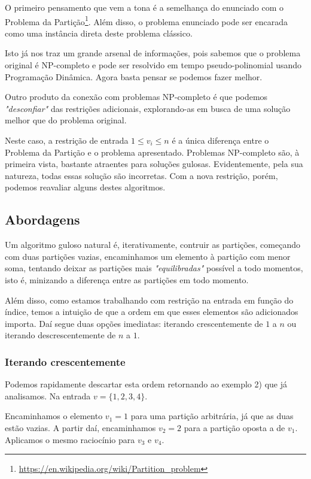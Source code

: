 O primeiro pensamento que vem a tona é a semelhança do enunciado com o Problema da Partição\footnote{\url{https://en.wikipedia.org/wiki/Partition_problem}}. Além disso, o problema enunciado pode ser encarada como uma instância direta deste problema clássico.

Isto já nos traz um grande arsenal de informações, pois sabemos que o problema original é NP-completo e pode ser resolvido em tempo pseudo-polinomial usando Programação Dinâmica. Agora basta pensar se podemos fazer melhor.

Outro produto da conexão com problemas NP-completo é que podemos \textit{"desconfiar"} das restrições adicionais, explorando-as em busca de uma solução melhor que do problema original.

Neste caso, a restrição de entrada $1 \leq v_i \leq n$ é a única diferença entre o Problema da Partição e o problema apresentado. 
Problemas NP-completo são, à primeira vista, bastante atraentes para soluções gulosas. Evidentemente, pela sua natureza, todas essas solução são incorretas. Com a nova restrição, porém, podemos reavaliar alguns destes algoritmos.

\subsection*{Abordagens}

Um algoritmo guloso natural é, iterativamente, contruir as partições, começando com duas partições vazias, encaminhamos um elemento à partição com menor soma, tentando deixar as partições mais \emph{"equilibradas"} possível a todo momentos, isto é, minizando a diferença entre as partições em todo momento.

Além disso, como estamos trabalhando com restrição na entrada em função do índice, temos a intuição de que a ordem em que esses elementos são adicionados importa. Daí segue duas opções imediatas: iterando crescentemente de $1$ a $n$ ou iterando descrescentemente de $n$ a $1$.

\subsubsection*{Iterando crescentemente}

Podemos rapidamente descartar esta ordem retornando ao exemplo 2) que já analisamos. Na entrada $v = \{1, 2, 3, 4\}$.

Encaminhamos o elemento $v_1 = 1$ para uma partição arbitrária, já que as duas estão vazias. A partir daí, encaminhamos $v_2 = 2$ para a partição oposta a de $v_1$. Aplicamos o mesmo raciocínio para $v_3$ e $v_4$.

